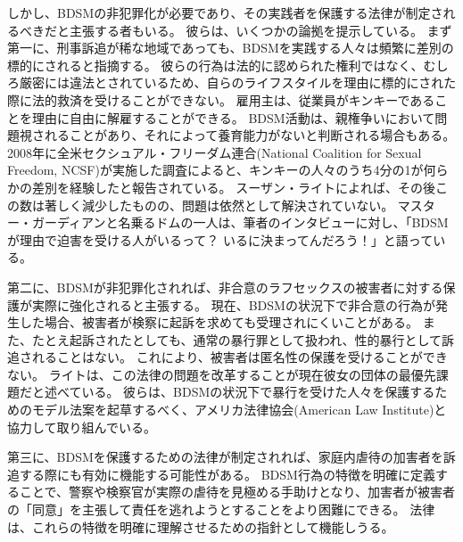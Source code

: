 \documentclass[paper=a4,book,openany]{jlreq}
\begin{document}
しかし、BDSMの非犯罪化が必要であり、その実践者を保護する法律が制定されるべきだと主張する者もいる。
彼らは、いくつかの論拠を提示している。
まず第一に、刑事訴追が稀な地域であっても、BDSMを実践する人々は頻繁に差別の標的にされると指摘する。
彼らの行為は法的に認められた権利ではなく、むしろ厳密には違法とされているため、自らのライフスタイルを理由に標的にされた際に法的救済を受けることができない。
雇用主は、従業員がキンキーであることを理由に自由に解雇することができる\citep{keenan14:_can_you_reall}。
BDSM活動は、親権争いにおいて問題視されることがあり、それによって養育能力がないと判断される場合もある\citep{zavadski15:_paren_can_lose}。
2008年に全米セクシュアル・フリーダム連合(National Coalition for Sexual Freedom, NCSF)が実施した調査によると、キンキーの人々のうち4分の1が何らかの差別を経験したと報告されている\citep{sexual08:_secon_nation_survey_violen_discr}。
スーザン・ライトによれば、その後この数は著しく減少したものの、問題は依然として解決されていない。
マスター・ガーディアンと名乗るドムの一人は、筆者のインタビューに対し、「BDSMが理由で迫害を受ける人がいるって？ いるに決まってんだろう！」と語っている。

第二に、BDSMが非犯罪化されれば、非合意のラフセックスの被害者に対する保護が実際に強化されると主張する。
現在、BDSMの状況下で非合意の行為が発生した場合、被害者が検察に起訴を求めても受理されにくいことがある。
また、たとえ起訴されたとしても、通常の暴行罪として扱われ、性的暴行として訴追されることはない。
これにより、被害者は匿名性の保護を受けることができない。
ライトは、この法律の問題を改革することが現在彼女の団体の最優先課題だと述べている。
彼らは、BDSMの状況下で暴行を受けた人々を保護するためのモデル法案を起草するべく、アメリカ法律協会(American Law Institute)と協力して取り組んでいる\citep{mcarthur16:_its_traves_that_bdsm_isnt_techn_legal}。

第三に、BDSMを保護するための法律が制定されれば、家庭内虐待の加害者を訴追する際にも有効に機能する可能性がある。
BDSM行為の特徴を明確に定義することで、警察や検察官が実際の虐待を見極める手助けとなり、加害者が被害者の「同意」を主張して責任を逃れようとすることをより困難にできる。
法律は、これらの特徴を明確に理解させるための指針として機能しうる。
\end{document}
